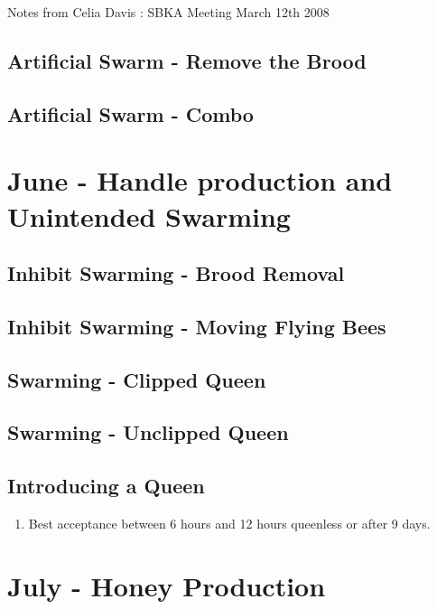 \documentclass[12pt, a4paper, twoside, british]{article}
\begin{document}
Notes from Celia Davis : SBKA Meeting March 12th 2008




\subsection{Artificial Swarm - Remove the Brood}

\subsection{Artificial Swarm - Combo}



\section{June - Handle production and Unintended Swarming}

\subsection{Inhibit Swarming - Brood Removal}

\subsection{Inhibit Swarming - Moving Flying Bees}

\subsection{Swarming - Clipped Queen}

\subsection{Swarming - Unclipped Queen}

\subsection{Introducing a Queen}
 
 \begin{enumerate}
	\item{Best acceptance between 6 hours and 12 hours queenless or after 9 days.}
\end{enumerate}
 
 
 
\section{July - Honey Production}
\end{document}
